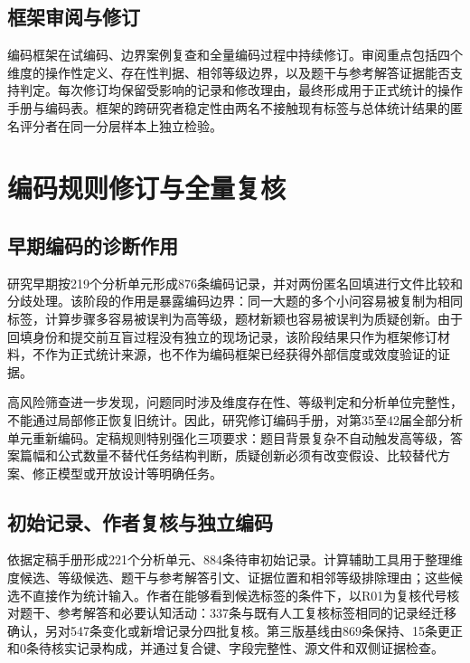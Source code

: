 \documentclass[
  12pt,
  a4paper,twoside,openany]{ctexbook}
\begin{document}
\subsection{框架审阅与修订}\label{ux6846ux67b6ux5ba1ux9605ux4e0eux4feeux8ba2}

编码框架在试编码、边界案例复查和全量编码过程中持续修订。审阅重点包括四个维度的操作性定义、存在性判据、相邻等级边界，以及题干与参考解答证据能否支持判定。每次修订均保留受影响的记录和修改理由，最终形成用于正式统计的操作手册与编码表。框架的跨研究者稳定性由两名不接触现有标签与总体统计结果的匿名评分者在同一分层样本上独立检验。

\section{编码规则修订与全量复核}\label{ux7f16ux7801ux89c4ux5219ux4feeux8ba2ux4e0eux5168ux91cfux590dux6838}

\subsection{早期编码的诊断作用}\label{ux65e9ux671fux7f16ux7801ux7684ux8bcaux65adux4f5cux7528}

研究早期按219个分析单元形成876条编码记录，并对两份匿名回填进行文件比较和分歧处理。该阶段的作用是暴露编码边界：同一大题的多个小问容易被复制为相同标签，计算步骤多容易被误判为高等级，题材新颖也容易被误判为质疑创新。由于回填身份和提交前互盲过程没有独立的现场记录，该阶段结果只作为框架修订材料，不作为正式统计来源，也不作为编码框架已经获得外部信度或效度验证的证据。

高风险筛查进一步发现，问题同时涉及维度存在性、等级判定和分析单位完整性，不能通过局部修正恢复旧统计。因此，研究修订编码手册，对第35至42届全部分析单元重新编码。定稿规则特别强化三项要求：题目背景复杂不自动触发高等级，答案篇幅和公式数量不替代任务结构判断，质疑创新必须有改变假设、比较替代方案、修正模型或开放设计等明确任务。

\subsection{初始记录、作者复核与独立编码}\label{ux521dux59cbux8bb0ux5f55ux4f5cux8005ux590dux6838ux4e0eux72ecux7acbux7f16ux7801}

依据定稿手册形成221个分析单元、884条待审初始记录。计算辅助工具用于整理维度候选、等级候选、题干与参考解答引文、证据位置和相邻等级排除理由；这些候选不直接作为统计输入。作者在能够看到候选标签的条件下，以R01为复核代号核对题干、参考解答和必要认知活动：337条与既有人工复核标签相同的记录经迁移确认，另对547条变化或新增记录分四批复核。第三版基线由869条保持、15条更正和0条待核实记录构成，并通过复合键、字段完整性、源文件和双侧证据检查。
\end{document}
